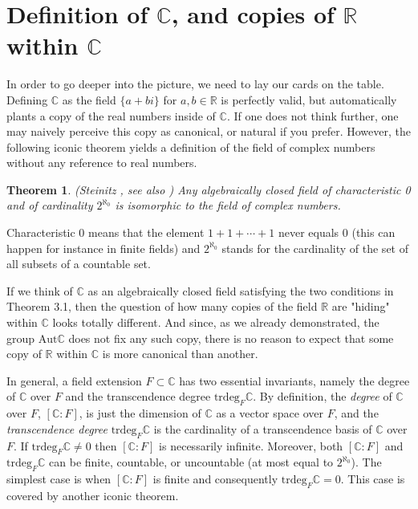 \documentclass[11pt]{article}
\theoremstyle{plain}
\newtheorem{theorem}{Theorem}[section]
\theoremstyle{definition}
\theoremstyle{remark}
\begin{document}
\section{Definition of $\mathbb{C}$, and copies of $\mathbb{R}$ within $\mathbb{C}$}

In order to go deeper into the picture, we need to lay our cards on the table. Defining $\mathbb{C}$ as the field $\{a + bi\}$ for $a,b \in \mathbb{R}$ is perfectly valid, but automatically plants a copy of the real numbers inside of $\mathbb{C}$. If one does not think further, one may naively perceive this copy as canonical, or natural if you prefer. However, the following iconic theorem yields a definition of the field of complex numbers without any reference to real numbers. 

\begin{theorem} \label{Steinitz}
    (Steinitz \textnormal{\cite{Steinitz}}, see also \textnormal{\cite[Ch.VI, Thm.~1.12]{Hungerford}}) Any algebraically closed field of characteristic 0 and of cardinality $2^{\aleph_0}$ is isomorphic to the field of complex numbers. 
\end{theorem}

Characteristic 0 means that the element $1 + 1 + \cdots +1 $ never equals 0 (this can happen for instance in finite fields) and $2^{\aleph_0}$ stands for the cardinality of the set of all subsets of a countable set.
\par
If we think of $\mathbb{C}$ as an algebraically closed field satisfying the two conditions in Theorem 3.1, then the question of how many copies of the field $\mathbb{R}$ are "hiding" within $\mathbb{C}$ looks totally different. And since, as we already demonstrated, the group $\mathrm{Aut} \mathbb{C}$ does not fix any such copy, there is no reason to expect that some copy of $\mathbb{R}$ within $\mathbb{C}$ is more canonical than another.
\par
In general, a field extension $F \subset \mathbb{C}$ has two essential invariants, namely the degree of $\mathbb{C}$ over $F$ and the transcendence degree $\mathrm{trdeg}_F \mathbb{C} $. By definition, the \textit{degree} of $\mathbb{C}$ over $F$, $[\mathbb{C}:F]$, is just the dimension of $\mathbb{C}$ as a vector space over $F$, and the \textit{transcendence degree} $\mathrm{trdeg}_F \mathbb{C}$ is the cardinality of a transcendence basis of $\mathbb{C}$ over $F$. If $\mathrm{trdeg}_F \mathbb{C} \neq 0$ then $[ \mathbb{C}: F ]$ is necessarily infinite. Moreover, both $[ \mathbb{C}: F ]$ and
$\mathrm{trdeg}_F \mathbb{C}$ can be finite, countable, or uncountable (at most equal to $2^{\aleph_0}$). The simplest case is when $[ \mathbb{C}: F ]$ is finite and consequently $\mathrm{trdeg}_F \mathbb{C} = 0$. This case is covered by another iconic theorem.
\end{document}
